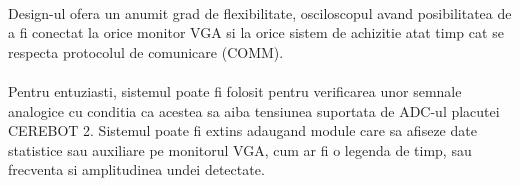 \documentclass[10pt,a4paper]{article}
\begin{document}
\paragraph{}
Design-ul ofera un anumit grad de flexibilitate, osciloscopul avand posibilitatea de a fi conectat la orice monitor VGA si la orice sistem de achizitie atat timp cat se respecta protocolul de comunicare (COMM).
\paragraph{}
Pentru entuziasti, sistemul poate fi folosit pentru verificarea unor semnale analogice cu conditia ca acestea sa aiba tensiunea suportata de ADC-ul placutei CEREBOT 2. Sistemul poate fi extins adaugand module care sa afiseze date statistice sau auxiliare pe monitorul VGA, cum ar fi o legenda de timp, sau frecventa si amplitudinea undei detectate.
\clearpage

\end{document}
